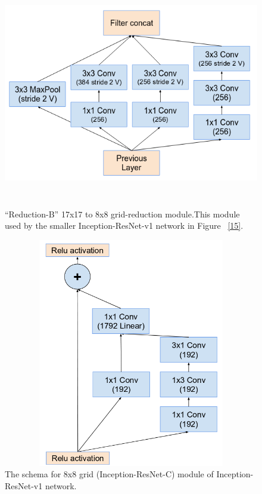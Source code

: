 \documentclass[a4paper,12pt, twoside]{NITKReport}
\begin{document}
\begin{figure}

\centering
\includegraphics[height=10cm,width=13cm]{figure12.png}
    \caption{“Reduction-B” 17x17 to 8x8 grid-reduction module.This module used by the smaller Inception-ResNet-v1 network in Figure ~\ref{15}.~\cite{szegedy2017inception}}
\label{12}
\end{figure}

\begin{figure}[h]
  \centering
    
    \includegraphics[height=10cm,width=13cm]{figure13.png}
    \caption{ The schema for 8x8 grid (Inception-ResNet-C) module of Inception-ResNet-v1 network.~\cite{szegedy2017inception}}
    \label{13}
   \end{figure}
 
\end{document}
